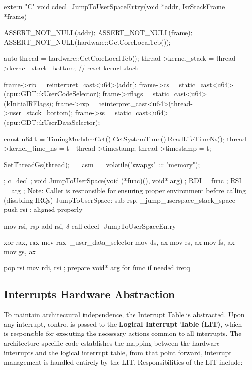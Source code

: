 \documentclass[a4paper,10pt,twoside]{report}
\theoremstyle{definition}
\begin{document}
\clearpage

\begin{cppcode}[caption={User Space Jump C++ code}, label={lst:userSpaceJump}]
extern "C" void cdecl_JumpToUserSpaceEntry(void *addr, IsrStackFrame *frame)
{
    ASSERT_NOT_NULL(addr);
    ASSERT_NOT_NULL(frame);
    ASSERT_NOT_NULL(hardware::GetCoreLocalTcb());

    auto thread          = hardware::GetCoreLocalTcb();
    thread->kernel_stack = thread->kernel_stack_bottom; // reset kernel stack

    frame->rip    = reinterpret_cast<u64>(addr);
    frame->cs     = static_cast<u64>(cpu::GDT::kUserCodeSelector);
    frame->rflags = static_cast<u64>(kInitialRFlags);
    frame->rsp    = reinterpret_cast<u64>(thread->user_stack_bottom);
    frame->ss     = static_cast<u64>(cpu::GDT::kUserDataSelector);

    const u64 t            = TimingModule::Get().GetSystemTime().ReadLifeTimeNs();
    thread->kernel_time_ns = t - thread->timestamp;
    thread->timestamp      = t;

    SetThreadGs(thread);
    __asm__ volatile("swapgs" ::: "memory");
}
\end{cppcode}

\clearpage

\begin{nasmcode}[caption={User Space Jump NASM code}, label={lst:userSpaceJumpNasm}]
; c_decl
; void JumpToUserSpace(void (*func)(), void* arg)
;   RDI = func
;   RSI = arg
; Note: Caller is responsible for ensuring proper environment before calling (disabling IRQs)
JumpToUserSpace:
    sub rsp, _jump_userspace_stack_space
    push rsi
    ; aligned properly

    mov rsi, rsp
    add rsi, 8
    call cdecl_JumpToUserSpaceEntry

    xor rax, rax
    mov rax, _user_data_selector
    mov ds, ax
    mov es, ax
    mov fs, ax
    mov gs, ax

    pop rsi
    mov rdi, rsi ; prepare void* arg for func if needed
    iretq
\end{nasmcode}

\subsection{Interrupts Hardware Abstraction}

To maintain architectural independence, the Interrupt Table is abstracted. Upon any interrupt, control is passed to the \textbf{Logical Interrupt Table (LIT)}, which is responsible for executing the necessary actions common to all interrupts. The architecture-specific code establishes the mapping between the hardware interrupts and the logical interrupt table, from that point forward, interrupt management is handled entirely by the LIT. Responsibilities of the LIT include:
\end{document}
